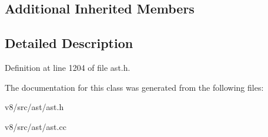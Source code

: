 \subsection*{Additional Inherited Members}


\subsection{Detailed Description}


Definition at line 1204 of file ast.\+h.



The documentation for this class was generated from the following files\+:\begin{DoxyCompactItemize}
\item 
v8/src/ast/ast.\+h\item 
v8/src/ast/ast.\+cc\end{DoxyCompactItemize}
